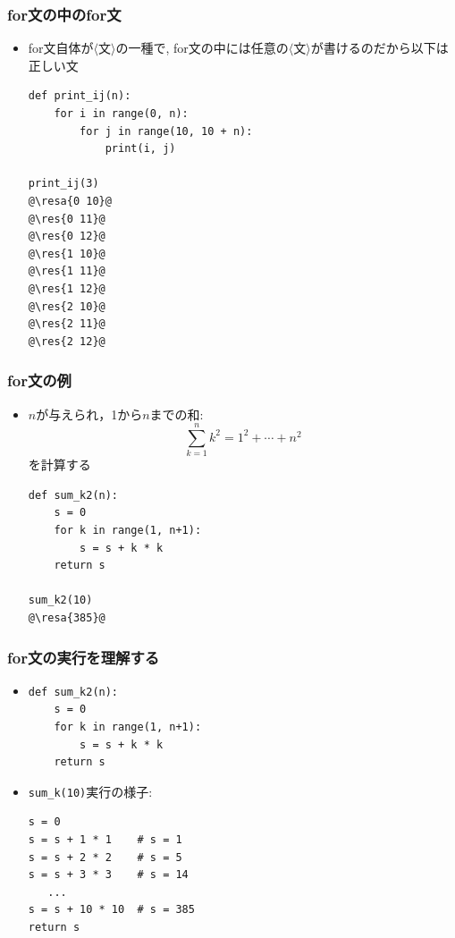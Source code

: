 \documentclass[10pt,dvipdfmx]{beamer}
\newcommand{\ore}[1]{{\color{orange}#1}}
\newcommand{\resa}[1]{\ore{\textsl{$\rightarrow$ #1}}}
\newcommand{\res}[1]{\ore{\textsl{#1}}}
\begin{document}
\begin{frame}[fragile]
\frametitle{for文の中のfor文}
\begin{itemize}
\item for文自体が$\langle$文$\rangle$の一種で,
  for文の中には任意の$\langle$文$\rangle$が書けるのだから以下は正しい文
\begin{lstlisting}
def print_ij(n):
    for i in range(0, n):
        for j in range(10, 10 + n):
            print(i, j)

print_ij(3)
@\resa{0 10}@
@\res{0 11}@
@\res{0 12}@
@\res{1 10}@
@\res{1 11}@
@\res{1 12}@
@\res{2 10}@
@\res{2 11}@
@\res{2 12}@
\end{lstlisting}
\end{itemize}
\end{frame}

\begin{frame}[fragile]
\frametitle{for文の例}
\begin{itemize}
\item $n$が与えられ，1から$n$までの和:
\[ \sum_{k=1}^n k^2 = 1^2 + \cdots + n^2 \]
を計算する
\begin{lstlisting}
def sum_k2(n):
    s = 0
    for k in range(1, n+1):
        s = s + k * k
    return s

sum_k2(10)
@\resa{385}@
\end{lstlisting}
\end{itemize}
\end{frame}

\begin{frame}[fragile]
\frametitle{for文の実行を理解する}
\begin{itemize}
\item 
\begin{lstlisting}
def sum_k2(n):
    s = 0
    for k in range(1, n+1):
        s = s + k * k
    return s
\end{lstlisting}
\item {\tt sum\_k(10)}実行の様子:
\begin{lstlisting}
s = 0
s = s + 1 * 1    # s = 1
s = s + 2 * 2    # s = 5
s = s + 3 * 3    # s = 14
   ...
s = s + 10 * 10  # s = 385
return s
\end{lstlisting}
\end{itemize}
\end{frame}
\end{document}
